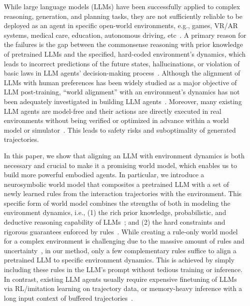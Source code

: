 \documentclass{article} %
\begin{document}
While large language models (LLMs) have been successfully applied to complex reasoning, generation, and planning tasks, they are not sufficiently reliable to be deployed as an agent in specific open-world environments, e.g., games, VR/AR systems, medical care, education, autonomous driving, etc~\citep{gpt-4,nips/cot, liu2024aligning}. A primary reason for the failures is the gap between the commonsense reasoning with prior knowledge of pretrained LLMs and the specified, hard-coded environment's dynamics, which leads to incorrect predictions of the future states, hallucinations, or violation of basic laws in LLM agents' decision-making process~\citep{corr/embodiedgpt,yang2024embodied,cvpr/EmbodiedQA,wu2024autohallusion}. 
Although the alignment of LLMs with human preferences has been widely studied as a major objective of LLM post-training, ``world alignment'' with an environment's dynamics has not been adequately investigated in building LLM agents~\citep{hao2023reasoning,rafailov2024direct,ge2024worldgpt}. Moreover, many existing LLM agents are model-free and their actions are directly executed in real environments without being verified or optimized in advance within a world model or simulator~\citep{corr/embodiedgpt,yao2023react,shinn2024reflexion,corr/rt-2,wu2023autogen,micheli2021language,rss/rt-1}. This leads to safety risks and suboptimality of generated trajectories. 

In this paper, we show that aligning an LLM with environment dynamics is both necessary and crucial to make it a promising world model, which enables us to build more powerful embodied agents. In particular, we introduce a neurosymbolic world model that composites a pretrained LLM with a set of newly learned rules from the interaction trajectories with the environment. This specific form of world model combines the strengths of both in modeling the environment dynamics, i.e., (1) the rich prior knowledge, probabilistic, and deductive reasoning capability of LLMs~\citep{hu2023language}; and (2) the hard constraints and rigorous guarantees enforced by rules~\citep{li2024ruler}. While creating a rule-only world model for a complex environment is challenging due to the massive amount of rules and uncertainty~\citep{xiao2021rule}, in our method, only a few complementary rules suffice to align a pretrained LLM to specific environment dynamics. This is achieved by simply including these rules in the LLM's prompt without tedious training or inference. 
In contrast, existing LLM agents usually require expensive finetuning of LLMs via RL/imitation learning on trajectory data, or memory-heavy inference with a long input context of buffered trajectories~\citep{corr/embodiedgpt,gao2023pg-vlm,yang2024embodied,shinn2024reflexion}. 
\end{document}
